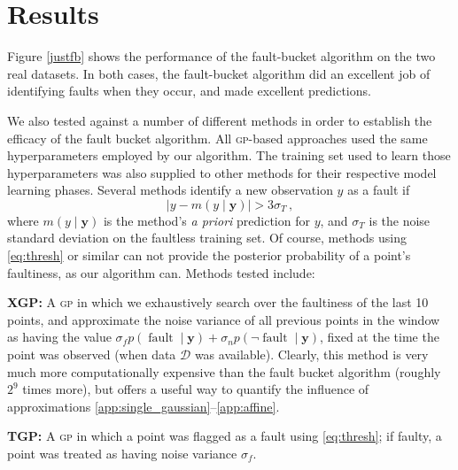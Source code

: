 \documentclass{article}
\newcommand{\given}{\ensuremath{\mid}}
\newcommand{\cm}[1]{\ensuremath{\mathcal{#1}}}
\newcommand{\bm}[1]{\ensuremath{\mathbf{#1}}}
\newcommand{\data}{\ensuremath{\cm{D}}}
\newcommand{\acro}[1]{\textsc{#1}}
\newcommand{\vect}[1]{\bm{#1}}
\newcommand{\vy}{\vect{y}}
\newcommand{\p}[2]{p(#1\given#2)}
\newcommand{\mean}[2]{{m}(#1\given#2)}
\DeclareMathOperator{\fault}{fault}
\begin{document}
\section{Results}
Figure \ref{justfb} shows the performance of the fault-bucket
algorithm on the two real datasets.  In both cases, the fault-bucket
algorithm did an excellent job of identifying faults when they occur,
and made excellent predictions.  

We also tested against a number of different methods in order to establish the efficacy of the fault bucket algorithm. All \acro{gp}-based approaches used the same hyperparameters employed by our algorithm. The training set used to learn those hyperparameters was also supplied to other methods for their respective model learning phases. Several methods identify a new observation $y$ as a fault if
\begin{equation}
 \bigl\lvert y-\mean{y}{\vy} \bigr\rvert > 3\sigma_T\,,
 \label{eq:thresh}
\end{equation}
where $\mean{y}{\vy}$ is the method's \emph{a priori} prediction for $y$, and $\sigma_T$ is the noise standard deviation on the faultless training set. Of course, methods using \eqref{eq:thresh} or similar can not provide the posterior probability of a point's faultiness, as our algorithm can. Methods tested include:

{\bf XGP:}
A  \acro{gp} in which we exhaustively search over the faultiness of the last 10 points, and approximate the noise variance of all previous points in the window as having the value $\sigma_f \p{\fault}{\vy} + \sigma_n \p{\neg\fault}{\vy}$, fixed at the time the point was observed (when data $\data$ was available). Clearly, this method is very much more computationally expensive than the fault bucket algorithm (roughly $2^9$ times more), but offers a useful way to quantify the influence of approximations \ref{app:single_gaussian}--\ref{app:affine}.

{\bf TGP:}
A \acro{gp} in which a point was flagged as a fault using \eqref{eq:thresh}; if faulty, a point was treated as having noise variance $\sigma_f$.

\end{document}
